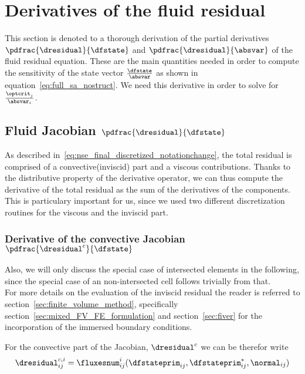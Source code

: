 \documentclass[../main.tex]{subfiles}
\begin{document}
\setlength{\delimitershortfall}{0pt}

\section{Derivatives of the fluid residual}\label{sec:dresidual_derivative}
This section is denoted to a thorough derivation of the partial derivatives $\pdfrac{\dresidual}{\dfstate}$ and $\pdfrac{\dresidual}{\absvar}$ of the fluid residual equation.
These are the main quantities needed in order to compute the sensitivity of the state vector $\tfrac{\dfstate}{\absvar}$ as shown in equation~\eqref{eq:full_sa_nostruct}.
We need this derivative in order to solve for $\tfrac{\optcrit_{j}}{\absvar_{i}}$.\\


\subsection{Fluid Jacobian $\pdfrac{\dresidual}{\dfstate}$}\label{sec:fluid_jacobian}





As described in~\eqref{eq:nse_final_discretized_notationchange}, the total residual is comprised of a convective(inviscid) part and a viscous contributions. Thanks to the distributive property of the derivative operator, we can thus compute the derivative of the total residual as the sum of the derivatives of the components. This is particulary important for us, since we used two different discretization routines for the viscous and the inviscid part.\\



\subsubsection{Derivative of the convective Jacobian $\pdfrac{\dresidual^c}{\dfstate}$}

Also, we will only discuss the special case of intersected elements in the following, since the special case of an non-intersected cell follows trivially from that.\\
For more details on the evaluation of the inviscid residual the reader is referred to section~\ref{sec:finite_volume_method}, specifically section~\ref{sec:mixed_FV_FE_formulation} and section~\ref{sec:fiver} for the incorporation of the immersed boundary conditions.


For the convective part of the Jacobian, $\dresidual^c$ we can be therefor write
\begin{align}
\dresidual^{c,i}_{ij} = \fluxesnum^i_{ij}(\dfstateprim_{ij},\dfstateprim^{*}_{ij},\normal_{ij})
\end{align}
\end{document}
